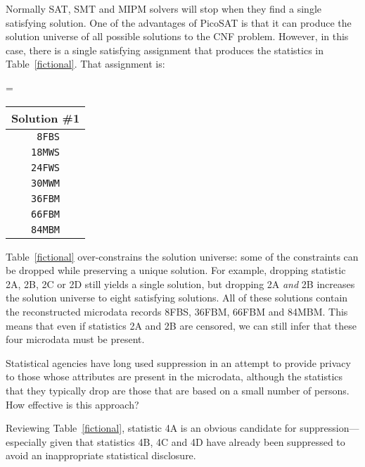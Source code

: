 \documentclass[runningheads]{llncs}
\begin{document}
Normally SAT, SMT and MIPM solvers will stop when they find a single
satisfying solution. One of the advantages of PicoSAT is that it can
produce the solution universe of all possible solutions to the CNF
problem. However, in this case, there is a single satisfying
assignment that produces the statistics in
Table~\ref{fictional}. That assignment is:

\begin{center}
\begin{minipage}{1.5in}
  
\end{minipage}
\begin{minipage}{.5in}
  =
\end{minipage}
\begin{minipage}{1.5in}
\begin{tabular}{c}
  Solution \#1\\
  \hline
\texttt{ 8FBS}\\
\texttt{18MWS}\\
\texttt{24FWS}\\
\texttt{30MWM}\\
\texttt{36FBM}\\
\texttt{66FBM}\\
\texttt{84MBM}\\
\end{tabular}
\end{minipage}
\end{center}  
Table~\ref{fictional} over-constrains the solution universe: some of the
constraints can be dropped while preserving a unique
solution. For example, dropping statistic 2A, 2B, 2C or 2D still yields a
single solution, but dropping 2A \emph{and} 2B increases the solution universe to
eight satisfying solutions. All of these solutions contain the
reconstructed microdata records 8FBS, 36FBM, 66FBM and 84MBM. This
means that even if statistics 2A and 2B are censored, we can still
infer that these four microdata must be present.

Statistical agencies have long used suppression in an
attempt to provide privacy to those whose attributes are present in
the microdata, although the statistics that they typically drop are
those that are based on a small number of persons. How effective is
this approach?

Reviewing Table~\ref{fictional}, statistic 4A is an obvious candidate
for suppression---especially given that statistics 4B, 4C and 4D have
already been suppressed to avoid an inappropriate statistical
disclosure.
\end{document}
